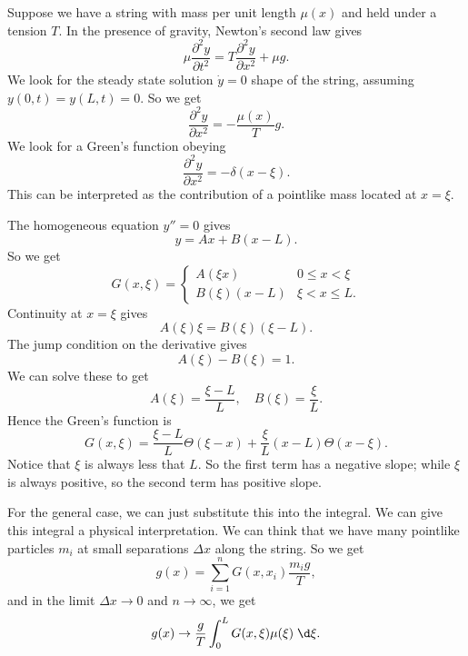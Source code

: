 \documentclass[a4paper]{article}
\begin{document}
\begin{eg}
  Suppose we have a string with mass per unit length $\mu(x)$ and held under a tension $T$. In the presence of gravity, Newton's second law gives
  \[
    \mu\frac{\partial^2 y}{\partial t^2} = T \frac{\partial^2 y}{\partial x^2} + \mu g.
  \]
  We look for the steady state solution $\dot{y} = 0$ shape of the string, assuming $y(0, t) = y(L, t) = 0$. So we get
  \[
    \frac{\partial^2 y}{\partial x^2} = -\frac{\mu(x)}{T}g.
  \]
  We look for a Green's function obeying
  \[
    \frac{\partial^2 y}{\partial x^2} = - \delta(x - \xi).
  \]
  This can be interpreted as the contribution of a pointlike mass located at $x = \xi$.
  \begin{center}
  \end{center}
  The homogeneous equation $y'' = 0$ gives
  \[
    y = Ax + B(x - L).
  \]
  So we get
  \[
    G(x, \xi) =
    \begin{cases}
      A(\xi x) & 0 \leq x < \xi\\
      B(\xi)(x - L) & \xi < x \leq L.
    \end{cases}
  \]
  Continuity at $x = \xi$ gives
  \[
    A(\xi)\xi = B(\xi) (\xi -L).
  \]
  The jump condition on the derivative gives
  \[
    A(\xi) - B(\xi) = 1.
  \]
  We can solve these to get
  \[
    A(\xi) = \frac{\xi - L}{L},\quad B(\xi) = \frac{\xi}{L}.
  \]
  Hence the Green's function is
  \[
    G(x, \xi) = \frac{\xi - L}{L} \Theta(\xi - x) + \frac{\xi}{L}(x - L) \Theta(x - \xi).
  \]
  Notice that $\xi$ is always less that $L$. So the first term has a negative slope; while $\xi$ is always positive, so the second term has positive slope.

  For the general case, we can just substitute this into the integral. We can give this integral a physical interpretation. We can think that we have many pointlike particles $m_i$ at small separations $\Delta x$ along the string. So we get
  \[
    g(x) = \sum_{i = 1}^n G(x, x_i) \frac{m_i g}{T},
  \]
  and in the limit $\Delta x \to 0$ and $n \to \infty$, we get
  \[
    g(x) \to \frac{g}{T} \int_0^L G(x, \xi) \mu(\xi)\;\d \xi.
  \]
\end{eg}
\end{document}
